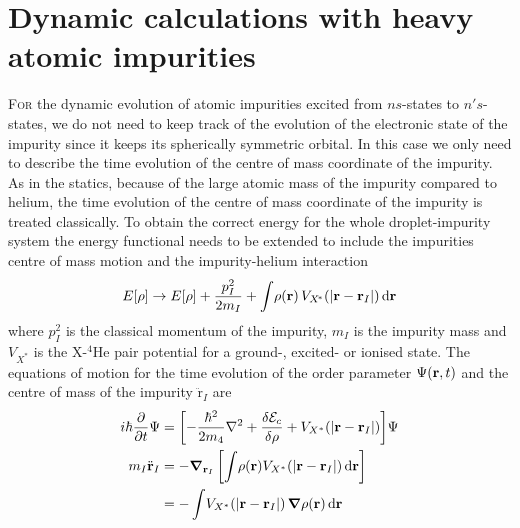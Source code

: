 \documentclass[12pt,a4paper,twosides]{book}
\renewcommand{\vec}[1]{\bm{\mathrm{#1}}}
\newcommand{\diff}[1]{\,\mathrm{d}{\vec{#1}}}
\begin{document}
	\clearpage
	\section{Dynamic calculations with heavy atomic impurities}
		\lettrine[lines=3,findent=3pt,nindent=0pt]{F}{or} the dynamic evolution of atomic impurities excited from $ns$-states to $n's$-states, we do not need to keep track of the evolution of the electronic state of the impurity since it keeps its spherically symmetric orbital. In this case we only need to describe the time evolution of the centre of mass coordinate of the impurity. As in the statics, because of the large atomic mass of the impurity compared to helium, the time evolution of the centre of mass coordinate of the impurity is treated classically. To obtain the correct energy for the whole droplet-impurity system the energy functional needs to be extended to include the impurities centre of mass motion and the impurity-helium interaction
		\begin{align}
			E[\rho] \rightarrow E[\rho] + \frac{p^2_I}{2 m_I} + \int \! \rho(\mathbf{r}) \, V_{X^{\!*}}\qty(\abs{\vec{r}-\vec{r}_I})\diff{r} \label{eq33}
		\end{align}
		where $p^2_I$ is the classical momentum of the impurity, $m_I$ is the impurity mass and $V_{X^{\!*}}$ is the X-$^4$He pair potential for a ground-, excited- or ionised state. The equations of motion for the time evolution of the order parameter $\Psi\qty(\vec{r},t)$ and the centre of mass of the impurity $\ddot{\vec{r}}_I$ are  
		\begin{align}
			i\hbar\frac{\partial}{\partial t} \Psi &= \qty[-\frac{\hbar^2}{2m_4} \laplacian +\frac{\delta {\cal E}_c}{\delta \rho} + V_{X^*}(|\mathbf{r}- \mathbf{r}_I|)]\Psi\nonumber\\
			m_I \ddot{\mathbf{r}}_I &= - \grad_{\vec{r}_I} \left[  \int \!\rho(\mathbf{r}) V_{X^*}(|\mathbf{r}- \mathbf{r}_I|)\diff{r}  \right] \nonumber \\
			&= -\int \! V_{X^*}(|\mathbf{r}- \mathbf{r}_I|)  \, \grad \rho(\mathbf{r})\diff{r} \label{eq34}
		\end{align}
	
\end{document}
